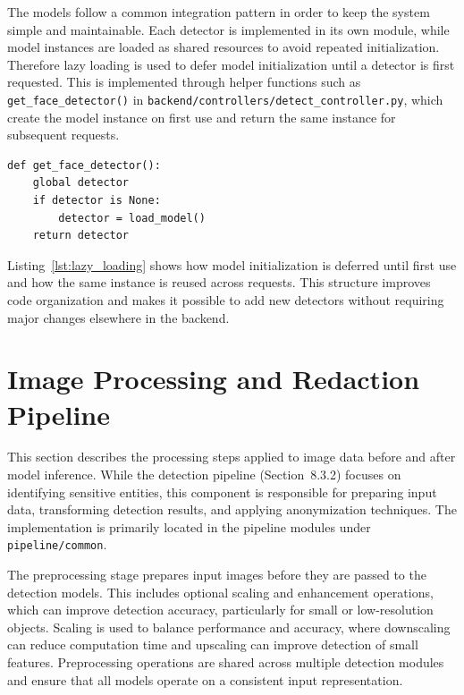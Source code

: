 
The models follow a common integration pattern in order to keep the system simple and maintainable. Each detector is implemented in its own module, while model instances are loaded as shared resources to avoid repeated initialization. Therefore lazy loading is used to defer model initialization until a detector is first requested. This is implemented through helper functions such as \texttt{get\_face\_detector()} in \texttt{backend/controllers/detect\_controller.py}, which create the model instance on first use and return the same instance for subsequent requests.

\begin{lstlisting}[caption={Lazy loading of detection model}, label={lst:lazy_loading}]
def get_face_detector():
    global detector
    if detector is None:
        detector = load_model()
    return detector
\end{lstlisting}

Listing~\ref{lst:lazy_loading} shows how model initialization is deferred until first use and how the same instance is reused across requests. This structure improves code organization and makes it possible to add new detectors without requiring major changes elsewhere in the backend.

\section{Image Processing and Redaction Pipeline}
\label{image_processing_and_redaction_pipeline}

This section describes the processing steps applied to image data before and after model \gls{inference}. While the detection pipeline (Section~8.3.2) focuses on identifying sensitive entities, this component is responsible for preparing input data, transforming detection results, and applying \gls{anonymization} techniques. The implementation is primarily located in the pipeline modules under \texttt{pipeline/common}.


\label{Preprocessing_subsection}

The preprocessing stage prepares input images before they are passed to the detection models. This includes optional scaling and enhancement operations, which can improve detection accuracy, particularly for small or low-resolution objects. Scaling is used to balance performance and accuracy, where downscaling can reduce computation time and upscaling can improve detection of small features. Preprocessing operations are shared across multiple detection modules and ensure that all models operate on a consistent input representation.

